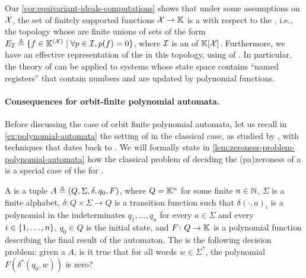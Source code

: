 \AP Our \cref{cor:equivariant-ideals-computations} shows that
under some assumptions on $\mathcal{X}$, the set of finitely supported functions
$\mathcal{X} \to \mathbb{K}$ is a  with respect to the
, i.e., the topology whose 
are finite unions of sets of the form $E_{\idl} \defined \setof{f \in
\K^{(\Indets)}}{\forall p \in \idl, p(f) = 0}$, where $\idl$ is an
 of $\mathbb{K}[\mathcal{X}]$. Furthermore, we have an
effective representation of the  in this topology, using
 of . In particular, the
theory of  can be applied to
systems whose state space contains ``named registers'' that contain numbers and
are updated by polynomial functions.


\paragraph{Consequences for orbit-finite polynomial automata.} Before
discussing the case of orbit finite polynomial automata, let us recall in
\cref{ex:polynomial-automata}
the
setting of  in the classical case, as studied by
\cite{BEDUSHWO17}, with techniques that dates back to \cite{MULSEI02}. We will
formally state in \cref{lem:zeroness-problem-polynomial-automata}
how the classical problem of deciding the \kl(pa){zeroness} of a
 is a special case of the  for .

\begin{definition}
  \label{ex:polynomial-automata}
  A  is a tuple $A \triangleq (Q, \Sigma, \delta, q_0, F)$,
  where $Q = \mathbb{K}^n$ for some finite $n \in \mathbb{N}$, $\Sigma$ is a finite alphabet,
  $\delta \colon Q \times \Sigma \to Q$ is a transition function such that 
  $\delta(\cdot,a)_i$ is a polynomial in the indeterminates $q_1, \dots, q_n$ for every
  $a \in \Sigma$ and every $i \in \{ 1, \dots, n \}$, $q_0 \in Q$ is the initial state,
  and $F \colon Q \to \mathbb{K}$ is a polynomial function describing the final result of the 
  automaton.
  The  is the following decision problem:
  given a  $A$, is it true that 
  for all words $w \in \Sigma^*$, the polynomial $F(\delta^*(q_0, w))$ is zero?
\end{definition}

